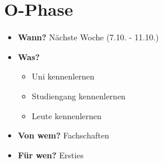 \section{O-Phase}
\begin{frame}
    \slidehead
    \begin{itemize}
        \item \textbf{Wann?} Nächste Woche (7.10. - 11.10.)
        \item \textbf{Was?}\begin{itemize}
                \item Uni kennenlernen
                \item Studiengang kennenlernen
                \item Leute kennenlernen
            \end{itemize}
        \item \textbf{Von wem?} Fachschaften
        \item \textbf{Für wen?} Ersties
    \end{itemize}
\end{frame}

